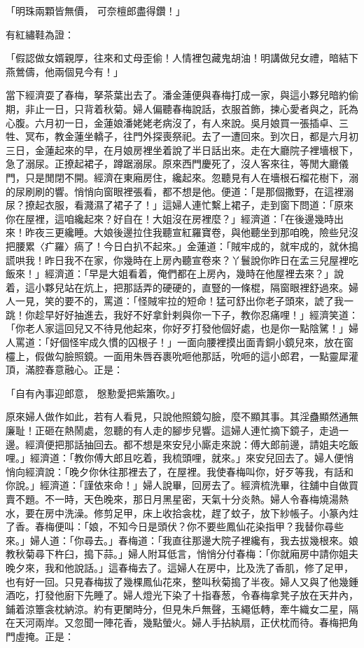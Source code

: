 「明珠兩顆皆無價，  可奈檀郎盡得鑽！」

有紅繡鞋為證：

「假認做女婿親厚，往來和丈母歪偷！人情裡包藏鬼胡油！明講做兒女禮，暗結下燕鶯儔，他兩個見今有！」

當下經濟耍了春梅，拏茶葉出去了。潘金蓮便與春梅打成一家，與這小夥兒暗約偷期，非止一日，只背着秋菊。婦人偏聽春梅說話，衣服首飾，揀心愛者與之，託為心腹。六月初一日，金蓮娘潘姥姥老病沒了，有人來說。吳月娘買一張插卓、三牲、冥布，教金蓮坐轎子，往門外探喪祭祀。去了一遭回來。到次日，都是六月初三日，金蓮起來的早，在月娘房裡坐着說了半日話出來。走在大廳院子裡墻根下，急了溺尿。正撩起裙子，蹲踞溺尿。原來西門慶死了，沒人客來往，等閒大廳儀門，只是閒閉不開。經濟在東廂房住，纔起來。忽聽見有人在墻根石榴花樹下，溺的尿刷刷的響。悄悄向窗眼裡張看，都不想是他。便道：「是那個撒野，在這裡溺尿？撩起衣服，看濺濕了裙子了！」這婦人連忙繫上裙子，走到窗下問道：「原來你在屋裡，這咱纔起來？好自在！大姐沒在房裡麼？」經濟道：「在後邊幾時出來！昨夜三更纔睡。大娘後邊拉住我聽宣紅羅寶卷，與他聽坐到那咱晚，險些兒沒把腰累〈疒羅〉瘑了！今日白扒不起來。」金蓮道：「賊牢成的，就牢成的，就休搗謊哄我！昨日我不在家，你幾時在上房內聽宣卷來？丫鬟說你昨日在孟三兒屋裡吃飯來！」經濟道：「早是大姐看着，俺們都在上房內，幾時在他屋裡去來？」說着，這小夥兒站在炕上，把那話弄的硬硬的，直豎的一條棍，隔窗眼裡舒過來。婦人一見，笑的要不的，罵道：「怪賊牢拉的短命！猛可舒出你老子頭來，諕了我一跳！你趁早好好抽進去，我好不好拿針剌與你一下子，教你忍痛哩！」經濟笑道：「你老人家這回兒又不待見他起來，你好歹打發他個好處，也是你一點陰騭！」婦人罵道：「好個怪牢成久慣的囚根子！」一面向腰裡摸出面青銅小鏡兒來，放在窗欞上，假做勾臉照鏡。一面用朱唇吞裹吮咂他那話，吮咂的這小郎君，一點靈犀灌頂，滿腔春意融心。正是：

「自有內事迎郎意，  慇懃愛把紫簫吹。」

原來婦人做作如此，若有人看見，只說他照鏡勾臉，麼不顯其事。其淫蠱顯然通無廉耻！正砸在熱鬧處，忽聽的有人走的腳步兒響。這婦人連忙摘下鏡子，走過一邊。經濟便把那話抽回去。都不想是來安兒小廝走來說：傅大郎前邊，請姐夫吃飯哩。」經濟道：「教你傅大郎且吃着，我梳頭哩，就來。」來安兒回去了。婦人便悄悄向經濟說：「晚夕你休往那裡去了，在屋裡。我使春梅叫你，好歹等我，有話和你說。」經濟道：「謹依來命！」婦人說畢，回房去了。經濟梳洗畢，往舖中自做買賣不題。不一時，天色晚來，那日月黑星密，天氣十分炎熱。婦人令春梅燒湯熱水，要在房中洗澡。修剪足甲，床上收拾衾枕，趕了蚊子，放下紗帳子。小篆內炷了香。春梅便叫：「娘，不知今日是頭伏？你不要些鳳仙花染指甲？我替你尋些來。」婦人道：「你尋去。」春梅道：「我直往那邊大院子裡纔有，我去拔幾根來。娘教秋菊尋下杵臼，搗下蒜。」婦人附耳低言，悄悄分付春梅：「你就廂房中請你姐夫晚夕來，我和他說話。」這春梅去了。這婦人在房中，比及洗了香肌，修了足甲，也有好一回。只見春梅拔了幾棵鳳仙花來，整叫秋菊搗了半夜。婦人又與了他幾鍾酒吃，打發他廚下先睡了。婦人燈光下染了十指春葱，令春梅拿凳子放在天井內，鋪着涼簟衾枕納涼。約有更闌時分，但見朱戶無聲，玉繩低轉，牽牛織女二星，隔在天河兩岸。又忽聞一陣花香，幾點螢火。婦人手拈紈扇，正伏枕而待。春梅把角門虛掩。正是：

